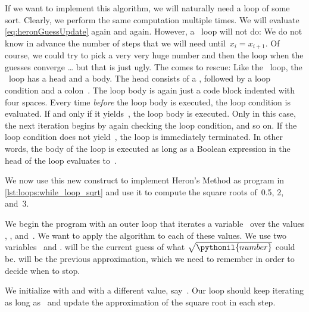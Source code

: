 If we want to implement this algorithm, we will naturally need a loop of some sort.
Clearly, we perform the same computation multiple times.
We will evaluate \cref{eq:heronGuessUpdate} again and again.
However, a ~loop will not do:
We do not know in advance the number of steps that we will need until~$x_i = x_{i+1}$.
Of course, we could try to pick a very very huge number and then  the loop when the guesses converge {\dots} but that is just ugly.
The  comes to rescue\cite{PSF:P3D:TPT:MCFT}:%
%
%
\FloatBarrier%
%
%
%
%
Like the ~loop, the ~loop has a head and a body.
The head consists of a , followed by a loop condition  and a colon~\pythonil{:}.
The loop body is again just a code block indented with four spaces.
Every time \emph{before} the loop body is executed, the loop condition  is evaluated.
If and only if it yields~, the loop body is executed.
Only in this case, the next iteration begins by again checking the loop condition, and so on.
If the loop condition does not yield~, the loop is immediately terminated.
In other words, the body of the loop is executed as long as a Boolean expression in the head of the loop evaluates to~.

We now use this new construct to implement Heron's Method as program  in \cref{lst:loops:while_loop_sqrt} and use it to compute the square roots of~0.5, 2, and~3.

We begin the program with an outer  loop that iterates a variable~ over the  values , , and~.
We want to apply the algorithm to each of these values.
We use two variables~ and .
 will be the current guess of what $\sqrt{\pythonil{number}}$ could be.
 will be the previous approximation, which we need to remember in order to decide when to stop.

We initialize  with  and  with a different value, say~.
Our  loop should keep iterating as long as~ and update the approximation of the square root in each step.

